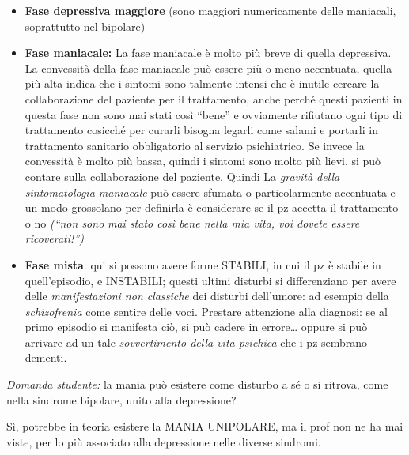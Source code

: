 \begin{itemize}
\item
  \textbf{Fase depressiva maggiore} (sono maggiori numericamente delle
  maniacali, soprattutto nel bipolare)
\item
  \textbf{Fase maniacale:} La fase maniacale è molto più breve di quella
  depressiva. La convessità della fase maniacale può essere più o meno
  accentuata, quella più alta indica che i sintomi sono talmente intensi
  che è inutile cercare la collaborazione del paziente per il
  trattamento, anche perché questi pazienti in questa fase non sono mai
  stati così ``bene'' e ovviamente rifiutano ogni tipo di trattamento
  cosicché per curarli bisogna legarli come salami e portarli in
  trattamento sanitario obbligatorio al servizio psichiatrico. Se invece
  la convessità è molto più bassa, quindi i sintomi sono molto più
  lievi, si può contare sulla collaborazione del paziente. Quindi La
  \emph{gravità della sintomatologia maniacale} può essere sfumata o
  particolarmente accentuata e un modo grossolano per definirla è
  considerare se il pz accetta il trattamento o no \emph{(``non sono}
  \emph{mai stato così bene nella mia vita, voi dovete essere
  ricoverati!'')}
\item
  \textbf{Fase mista}: qui si possono avere forme STABILI, in cui il pz
  è stabile in quell'episodio, e INSTABILI; questi ultimi disturbi si
  differenziano per avere delle \emph{manifestazioni non classiche} dei
  disturbi dell'umore: ad esempio della \emph{schizofrenia} come sentire
  delle voci. Prestare attenzione alla diagnosi: se al primo episodio si
  manifesta ciò, si può cadere in errore\ldots{} oppure si può arrivare
  ad un tale \emph{sovvertimento della vita psichica} che i pz sembrano
  dementi.
\end{itemize}

\emph{Domanda studente:} la mania può esistere come disturbo a sé o si
ritrova, come nella sindrome bipolare, unito alla depressione?

Sì, potrebbe in teoria esistere la MANIA UNIPOLARE, ma il prof non ne ha
mai viste, per lo più associato alla depressione nelle diverse sindromi.

